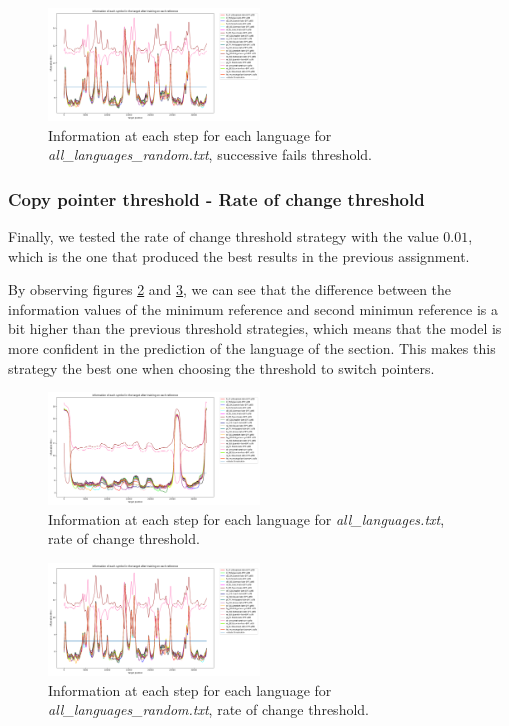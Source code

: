 \documentclass{article}
\begin{document}
\begin{figure}
    \centering
    \includegraphics[width=0.5\textwidth]{../results/all_languages_random/-t_f:9.png}
    \caption{Information at each step for each language for \textit{all\_languages\_random.txt}, successive fails threshold.}
    \label{fig:all_languages_random_t_f}
\end{figure}

\subsubsection{Copy pointer threshold - Rate of change threshold}
\label{subsubsec:results_locate_lang_rate_of_change_threshold}

Finally, we tested the rate of change threshold strategy with the value $0.01$, which is the one that produced the best results in the previous assignment.

By observing figures \ref{fig:all_languages_t_c} and \ref{fig:all_languages_random_t_c}, we can see that the difference between the information values of the minimum reference
and second minimun reference is a bit higher than the previous threshold strategies, which means that the model is more confident in the prediction of the language of the section.
This makes this strategy the best one when choosing the threshold to switch pointers.

\begin{figure}
    \centering
    \includegraphics[width=0.5\textwidth]{../results/all_languages/-t_c:0.01.png}
    \caption{Information at each step for each language for \textit{all\_languages.txt}, rate of change threshold.}
    \label{fig:all_languages_t_c}
\end{figure}

\begin{figure}
    \centering
    \includegraphics[width=0.5\textwidth]{../results/all_languages_random/-t_c:0.01.png}
    \caption{Information at each step for each language for \textit{all\_languages\_random.txt}, rate of change threshold.}
    \label{fig:all_languages_random_t_c}
\end{figure}
\end{document}
